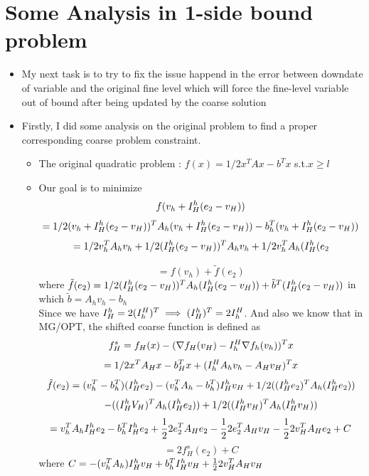 \documentclass[10pt]{article}
\begin{document}
\section{Some Analysis in 1-side bound problem}
\begin{itemize}
\item My next task is to try to fix the issue happend in the error between downdate of variable and the original fine level which will force the fine-level variable out of bound after being updated by the coarse solution
\item Firstly, I did some analysis on the original problem to find a proper corresponding coarse problem constraint.
\begin{itemize}
\item The original quadratic problem : $f(x)=1/2x^{T} Ax-b^{T} x$ s.t.$x\geq l$
\item Our goal is to minimize 
$$f(v_{h}+I_H^h(e_{2}-v_{H}))$$
$$=1/2(v_{h}+I_H^h(e_{2}-v_{H}))^{T}A_{h}(v_{h}+I_H^h(e_{2}-v_{H}))-b_{h}^{T}(v_{h}+I_H^h(e_{2}-v_{H}))$$	
$$=1/2v_{h}^{T}A_{h}v_{h}+1/2(I_H^h(e_{2}-v_{H}))^{T}A_{h}v_{h}+1/2v_{h}^{T}A_{h}(I_H^h(e_{2}$$


$$=f(v_{h})+\tilde{f}(e_{2})$$ where $\tilde{f}(e_{2})=1/2(I_H^h(e_{2}-v_{H}))^{T}A_{h}(I_H^h(e_{2}-v_{H}))+\tilde{b}^{T}(I_H^h(e_{2}-v_{H}))$ in which $\tilde{b}=A_{h}v_{h}-b_{h}$\\

Since we have $I_H^h=2 (I_h^H)^{T}\implies (I_H^h)^{T}=2I_h^H$. And also we know that in MG/OPT, the shifted coarse function is defined as $$f_{H}^{s}=f_{H}(x)-(\nabla f_{H}(v_{H})-I_h^H \nabla f_{h}(v_{h}))^{T}x$$
$$=1/2x^{T}A_{H}x-b_{H}^{T}x+(I_h^H A_{h}v_{h}-A_{H}v_{H})^{T}x$$
$$\tilde{f}(e_{2})=(v_{h}^{T}-b_{h}^{T})(I_H^h e_{2})-(v_{h}^{T}A_{h}-b_{h}^{T})I_H^h v_{H}+1/2((I_H^h e_{2})^{T}A_{h}(I_H^h e_{2}))$$
$$\quad \quad -((I_H^h V_{H})^{T}A_{h}(I_H^h e_{2}))+1/2((I_H^h v_{H})^{T}A_{h}(I_H^h v_{H}))$$
$$=v_{h}^{T}A_{h}I_H^h e_{2}-b_{h}^{T}I_H^h e_{2}+\frac{1}{2} 2 e_{2}^{T}A_{H}e_{2}-\frac{1}{2} 2 e_{2}^{T}A_{H}v_{H}-\frac{1}{2} 2 v_{H}^{T}A_{H}e_{2}+C$$ 
$$=2f_{H}^{s}(e_{2})+C$$ where $C=-(v_{h}^{T}A_{h})I_H^h v_{H}+b_{h}^{T}I_H^h v_{H}+\frac{1}{2} 2 v_{H}^{T}A_{H}v_{H}$\\


\end{itemize}
\end{itemize}
\end{document}
